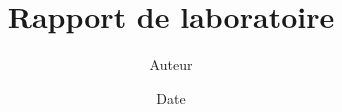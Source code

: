 \documentclass{article}
\begin{document}
    \title{Rapport de laboratoire}
    \author{Auteur}
    \date{Date}
    \maketitle
    \newpage
    \tableofcontents
    
    
\end{document}
